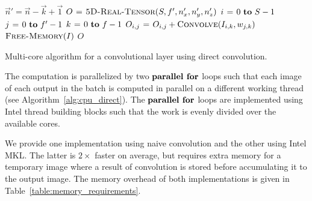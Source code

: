 \documentclass[conference]{./IEEEtran/IEEEtran}
\begin{document}
  \begin{algorithm}
    {\footnotesize
      \begin{codebox}
        \li $\vec{n}' = \vec{n} - \vec{k} + \vec{1}$
        \li $O \mathrel{\hspace{1pt}=\hspace{1pt}} \textnormal{\scshape5D-Real-Tensor}(S,f',n'_x,n'_y,n'_z)$
        \li {} $i \gets 0 \To S-1$
        \li   \Do {} $j \gets 0 \To f'-1$
        \li     \Do \For $k \gets 0 \To f-1$
        \li     \Do $O_{i,j} \mathrel{\hspace{1pt}=\hspace{1pt}} O_{i,j} + \textnormal{\scshape Convolve}(I_{i,k},w_{j,k})$
        \End \End \End
        \li $\textnormal{\scshape Free-Memory}(I)$
        \li \Return $O$
      \end{codebox}
    \caption{Multi-core algorithm for a convolutional layer using direct
      convolution.}
    \label{alg:cpu_direct}
    }
  \end{algorithm}

  The computation is parallelized by two $\textbf{parallel for}$ loops
  such that each image of each output in the batch is computed in
  parallel on a different working thread (see
  Algorithm~\ref{alg:cpu_direct}).  The $\textbf{parallel for}$ loops are
  implemented using Intel thread building blocks such that the work is
  evenly divided over the available cores.

  We provide one implementation using naive convolution and the other
  using Intel MKL.  The latter is $2\times$ faster on average, but
  requires extra memory for a temporary image where a result of
  convolution is stored before accumulating it to the output image.
  The memory overhead of both implementations is given in
  Table~\ref{table:memory_requirements}.
\end{document}
